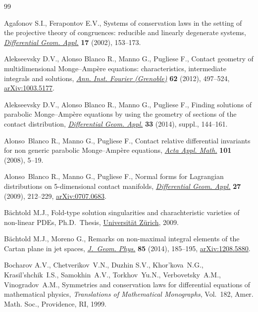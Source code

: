 \documentclass[10pt,a4paper]{amsart}
\numberwithin{equation}{section}
\begin{document}
\begin{thebibliography}{99}
\footnotesize\itemsep=-0.8pt

Agafonov S.I., Ferapontov E.V., Systems of conservation laws in the setting of
 the projective theory of congruences: reducible and linearly degenerate
 systems, \href{http://dx.doi.org/10.1016/S0926-2245(02)00105-5}{\textit{Differential Geom. Appl.}} \textbf{17} (2002), 153--173.

Alekseevsky D.V., Alonso Blanco R., Manno G., Pugliese F., Contact geometry of
 multidimensional {M}onge--{A}mp\`ere equations: characteristics, intermediate
 integrals and solutions, \href{http://dx.doi.org/10.5802/aif.2686}{\textit{Ann. Inst. Fourier (Grenoble)}} \textbf{62}
 (2012), 497--524, \href{http://arxiv.org/abs/1003.5177}{arXiv:1003.5177}.

Alekseevsky D.V., Alonso Blanco R., Manno G., Pugliese F., Finding solutions of
 parabolic {M}onge--{A}mp\`ere equations by using the geometry of sections of
 the contact distribution, \href{http://dx.doi.org/10.1016/j.difgeo.2013.10.015}{\textit{Differential Geom. Appl.}} \textbf{33}
 (2014), suppl., 144--161.

Alonso~Blanco R., Manno G., Pugliese F., Contact relative dif\/ferential
 invariants for non generic parabolic {M}onge--{A}mp\`ere equations,
 \href{http://dx.doi.org/10.1007/s10440-008-9204-8}{\textit{Acta Appl. Math.}} \textbf{101} (2008), 5--19.

Alonso~Blanco R., Manno G., Pugliese F., Normal forms for {L}agrangian
 distributions on 5-dimensional contact manifolds, \href{http://dx.doi.org/10.1016/j.difgeo.2008.06.019}{\textit{Differential Geom.
 Appl.}} \textbf{27} (2009), 212--229, \href{http://arxiv.org/abs/0707.0683}{arXiv:0707.0683}.

B{\"a}chtold M.J., Fold-type solution singularities and charachteristic
 varieties of non-linear PDEs, Ph.D.~Thesis, \href{http://dx.doi.org/10.5167/uzh-42719}{Universit\"at Z\"urich}, 2009.

B{\"a}chtold M.J., Moreno G., Remarks on non-maximal integral elements of the
 {C}artan plane in jet spaces, \href{http://dx.doi.org/10.1016/j.geomphys.2014.05.006}{\textit{J.~Geom. Phys.}} \textbf{85} (2014),
 185--195, \href{http://arxiv.org/abs/1208.5880}{arXiv:1208.5880}.

Bocharov A.V., Chetverikov~V.N., Duzhin S.V., Khor'kova~N.G., Krasil'shchik~I.S., Samokhin~A.V., Torkhov~Yu.N., Verbovetsky~A.M., Vinogradov~A.M.,
 Symmetries and conservation laws for dif\/ferential equations of mathematical
 physics, \textit{Translations of Mathematical Monographs}, Vol.~182, Amer.
 Math. Soc., Providence, RI, 1999.


\end{thebibliography}
\end{document}
